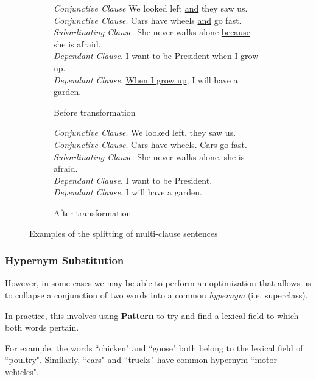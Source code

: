 \begin{figure}[H]
\begin{subfigure}{\textwidth}
\begin{displayquote}
\textit{Conjunctive Clause} We looked left \underline{and} they saw us.\\
\textit{Conjunctive Clause}. Cars have wheels \underline{and} go fast.\\
\textit{Subordinating Clause}. She never walks alone \underline{because} she is afraid.\\
\textit{Dependant Clause}. I want to be President \underline{when I grow up}.\\
\textit{Dependant Clause}. \underline{When I grow up}, I will have a garden.
\end{displayquote}
\caption{Before transformation}
\vspace{\baselineskip}
\end{subfigure}
\begin{subfigure}{\textwidth}
\begin{displayquote}
\textit{Conjunctive Clause}. We looked left. they saw us.\\
\textit{Conjunctive Clause}. Cars have wheels. Cars go fast.\\
\textit{Subordinating Clause}. She never walks alone. she is afraid.\\
\textit{Dependant Clause}. I want to be President.\\
\textit{Dependant Clause}. I will have a garden.
\caption{After transformation}
\end{displayquote}
\end{subfigure}
\caption{Examples of the splitting of multi-clause sentences}
\label{fig:clause_transformations}
\end{figure}

\subsubsection{Hypernym Substitution}

However, in some cases we may be able to perform an optimization that allows us to collapse a conjunction of two words into a common \textit{hypernym} (i.e. superclass).

In practice, this involves using \textbf{\href{http://web.archive.org/web/20190516161631/https://www.clips.uantwerpen.be/pages/pattern-en}{Pattern}} to try and find a lexical field to which both words pertain.

For example, the words ``chicken" and ``goose" both belong to the lexical field of ``poultry". Similarly, ``cars" and ``trucks" have common hypernym ``motor-vehicles".

